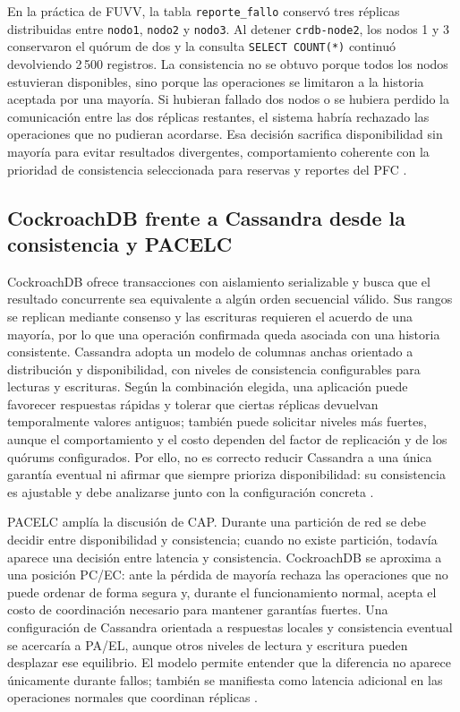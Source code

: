 \documentclass[12pt,a4paper]{article}
\begin{document}
En la práctica de FUVV, la tabla \texttt{reporte\_fallo} conservó tres réplicas distribuidas entre \texttt{nodo1}, \texttt{nodo2} y \texttt{nodo3}. Al detener \texttt{crdb-node2}, los nodos 1 y 3 conservaron el quórum de dos y la consulta \texttt{SELECT COUNT(*)} continuó devolviendo 2\,500 registros. La consistencia no se obtuvo porque todos los nodos estuvieran disponibles, sino porque las operaciones se limitaron a la historia aceptada por una mayoría. Si hubieran fallado dos nodos o se hubiera perdido la comunicación entre las dos réplicas restantes, el sistema habría rechazado las operaciones que no pudieran acordarse. Esa decisión sacrifica disponibilidad sin mayoría para evitar resultados divergentes, comportamiento coherente con la prioridad de consistencia seleccionada para reservas y reportes del PFC \cite{gilbert2002cap,taft2020cockroachdb}.

\subsection{CockroachDB frente a Cassandra desde la consistencia y PACELC}

CockroachDB ofrece transacciones con aislamiento serializable y busca que el resultado concurrente sea equivalente a algún orden secuencial válido. Sus rangos se replican mediante consenso y las escrituras requieren el acuerdo de una mayoría, por lo que una operación confirmada queda asociada con una historia consistente. Cassandra adopta un modelo de columnas anchas orientado a distribución y disponibilidad, con niveles de consistencia configurables para lecturas y escrituras. Según la combinación elegida, una aplicación puede favorecer respuestas rápidas y tolerar que ciertas réplicas devuelvan temporalmente valores antiguos; también puede solicitar niveles más fuertes, aunque el comportamiento y el costo dependen del factor de replicación y de los quórums configurados. Por ello, no es correcto reducir Cassandra a una única garantía eventual ni afirmar que siempre prioriza disponibilidad: su consistencia es ajustable y debe analizarse junto con la configuración concreta \cite{ferreira2024consistency,viotti2016consistency}.

PACELC amplía la discusión de CAP. Durante una partición de red se debe decidir entre disponibilidad y consistencia; cuando no existe partición, todavía aparece una decisión entre latencia y consistencia. CockroachDB se aproxima a una posición PC/EC: ante la pérdida de mayoría rechaza las operaciones que no puede ordenar de forma segura y, durante el funcionamiento normal, acepta el costo de coordinación necesario para mantener garantías fuertes. Una configuración de Cassandra orientada a respuestas locales y consistencia eventual se acercaría a PA/EL, aunque otros niveles de lectura y escritura pueden desplazar ese equilibrio. El modelo permite entender que la diferencia no aparece únicamente durante fallos; también se manifiesta como latencia adicional en las operaciones normales que coordinan réplicas \cite{gilbert2002cap,noudoust2022quorum}.
\end{document}
